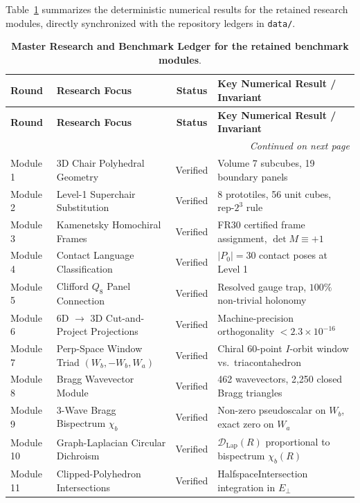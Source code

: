 \documentclass[11pt,a4paper]{article}
\theoremstyle{definition}
\begin{document}
Table~\ref{tab:master_ledger} summarizes the deterministic numerical results for the retained research modules, directly synchronized with the repository ledgers in \texttt{data/}.

\begin{longtable}{p{1.8cm}p{4.2cm}cp{6.2cm}}
\caption{\textbf{Master Research and Benchmark Ledger for the retained benchmark modules}.} \label{tab:master_ledger} \\
\toprule
\textbf{Round} & \textbf{Research Focus} & \textbf{Status} & \textbf{Key Numerical Result / Invariant} \\
\midrule
\endfirsthead
\toprule
\textbf{Round} & \textbf{Research Focus} & \textbf{Status} & \textbf{Key Numerical Result / Invariant} \\
\midrule
\endhead
\midrule
\multicolumn{4}{r}{\small\textit{Continued on next page}} \\
\bottomrule
\endfoot
\bottomrule
\endlastfoot
Module 1 & 3D Chair Polyhedral Geometry & Verified & Volume 7 subcubes, 19 boundary panels \\
Module 2 & Level-1 Superchair Substitution & Verified & 8 prototiles, 56 unit cubes, rep-$2^3$ rule \\
Module 3 & Kamenetsky Homochiral Frames & Verified & FR30 certified frame assignment, $\det M \equiv +1$ \\
Module 4 & Contact Language Classification & Verified & $|P_0| = 30$ contact poses at Level 1 \\
Module 5 & Clifford $Q_8$ Panel Connection & Verified & Resolved gauge trap, $100\%$ non-trivial holonomy \\
Module 6 & 6D $\to$ 3D Cut-and-Project Projections & Verified & Machine-precision orthogonality $< 2.3 \times 10^{-16}$ \\
Module 7 & Perp-Space Window Triad $(W_b, -W_b, W_a)$ & Verified & Chiral 60-point $I$-orbit window vs.\ triacontahedron \\
Module 8 & Bragg Wavevector Module & Verified & 462 wavevectors, 2,250 closed Bragg triangles \\
Module 9 & 3-Wave Bragg Bispectrum $\chi_b$ & Verified & Non-zero pseudoscalar on $W_b$, exact zero on $W_a$ \\
Module 10 & Graph-Laplacian Circular Dichroism & Verified & $\mathcal{D}_{\mathrm{Lap}}(R)$ proportional to bispectrum $\chi_b(R)$ \\
Module 11 & Clipped-Polyhedron Intersections & Verified & HalfspaceIntersection integration in $E_\perp$ \\

\end{longtable}
\end{document}
